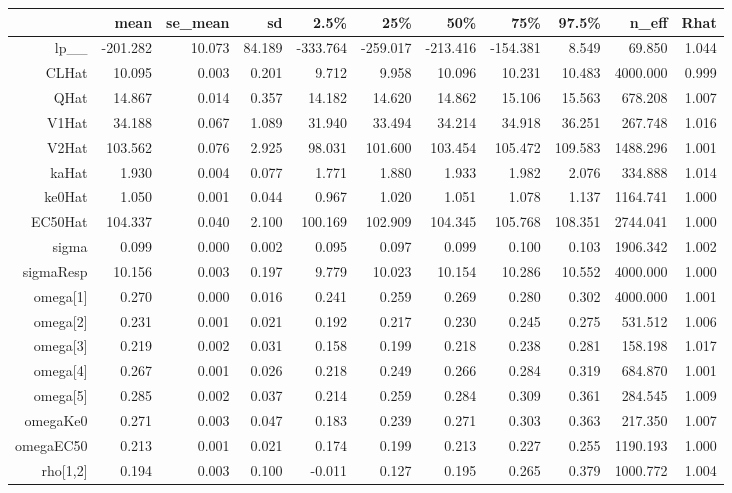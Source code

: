 \documentclass[11pt, reqno, oneside]{amsbook}
\numberwithin{equation}{chapter}
\numberwithin{figure}{chapter}
\numberwithin{table}{chapter}
\theoremstyle{remark}
\begin{document}
\begin{table}[htbp]
\centering
\footnotesize
\begin{tabular}{r r r r r r r r r r r}
 & mean & se\_mean & sd & 2.5\% & 25\% & 50\% & 75\% & 97.5\% & n\_eff & Rhat\\
\hline
lp\_\_ & -201.282 & 10.073 & 84.189 & -333.764 & -259.017 & -213.416 & -154.381 & 8.549 & 69.850 & 1.044\\
CLHat & 10.095 & 0.003 & 0.201 & 9.712 & 9.958 & 10.096 & 10.231 & 10.483 & 4000.000 & 0.999\\
QHat & 14.867 & 0.014 & 0.357 & 14.182 & 14.620 & 14.862 & 15.106 & 15.563 & 678.208 & 1.007\\
V1Hat & 34.188 & 0.067 & 1.089 & 31.940 & 33.494 & 34.214 & 34.918 & 36.251 & 267.748 & 1.016\\
V2Hat & 103.562 & 0.076 & 2.925 & 98.031 & 101.600 & 103.454 & 105.472 & 109.583 & 1488.296 & 1.001\\
kaHat & 1.930 & 0.004 & 0.077 & 1.771 & 1.880 & 1.933 & 1.982 & 2.076 & 334.888 & 1.014\\
ke0Hat & 1.050 & 0.001 & 0.044 & 0.967 & 1.020 & 1.051 & 1.078 & 1.137 & 1164.741 & 1.000\\
EC50Hat & 104.337 & 0.040 & 2.100 & 100.169 & 102.909 & 104.345 & 105.768 & 108.351 & 2744.041 & 1.000\\
sigma & 0.099 & 0.000 & 0.002 & 0.095 & 0.097 & 0.099 & 0.100 & 0.103 & 1906.342 & 1.002\\
sigmaResp & 10.156 & 0.003 & 0.197 & 9.779 & 10.023 & 10.154 & 10.286 & 10.552 & 4000.000 & 1.000\\
omega[1] & 0.270 & 0.000 & 0.016 & 0.241 & 0.259 & 0.269 & 0.280 & 0.302 & 4000.000 & 1.001\\
omega[2] & 0.231 & 0.001 & 0.021 & 0.192 & 0.217 & 0.230 & 0.245 & 0.275 & 531.512 & 1.006\\
omega[3] & 0.219 & 0.002 & 0.031 & 0.158 & 0.199 & 0.218 & 0.238 & 0.281 & 158.198 & 1.017\\
omega[4] & 0.267 & 0.001 & 0.026 & 0.218 & 0.249 & 0.266 & 0.284 & 0.319 & 684.870 & 1.001\\
omega[5] & 0.285 & 0.002 & 0.037 & 0.214 & 0.259 & 0.284 & 0.309 & 0.361 & 284.545 & 1.009\\
omegaKe0 & 0.271 & 0.003 & 0.047 & 0.183 & 0.239 & 0.271 & 0.303 & 0.363 & 217.350 & 1.007\\
omegaEC50 & 0.213 & 0.001 & 0.021 & 0.174 & 0.199 & 0.213 & 0.227 & 0.255 & 1190.193 & 1.000\\
rho[1,2] & 0.194 & 0.003 & 0.100 & -0.011 & 0.127 & 0.195 & 0.265 & 0.379 & 1000.772 & 1.004\\

\end{tabular}
\end{table}
\end{document}
